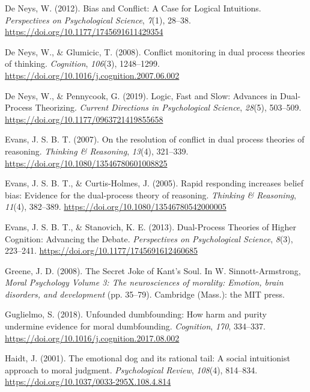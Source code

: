 \documentclass[
  american,
  man,floatsintext]{apa7}
\begin{document}
\leavevmode\hypertarget{ref-deneys_bias_2012}{}%
De Neys, W. (2012). Bias and Conflict: A Case for Logical Intuitions. \emph{Perspectives on Psychological Science}, \emph{7}(1), 28--38. \url{https://doi.org/10.1177/1745691611429354}

\leavevmode\hypertarget{ref-deneys_conflict_2008}{}%
De Neys, W., \& Glumicic, T. (2008). Conflict monitoring in dual process theories of thinking. \emph{Cognition}, \emph{106}(3), 1248--1299. \url{https://doi.org/10.1016/j.cognition.2007.06.002}

\leavevmode\hypertarget{ref-deneys_logic_2019}{}%
De Neys, W., \& Pennycook, G. (2019). Logic, Fast and Slow: Advances in Dual-Process Theorizing. \emph{Current Directions in Psychological Science}, \emph{28}(5), 503--509. \url{https://doi.org/10.1177/0963721419855658}

\leavevmode\hypertarget{ref-evans_resolution_2007}{}%
Evans, J. S. B. T. (2007). On the resolution of conflict in dual process theories of reasoning. \emph{Thinking \& Reasoning}, \emph{13}(4), 321--339. \url{https://doi.org/10.1080/13546780601008825}

\leavevmode\hypertarget{ref-evans_rapid_2005}{}%
Evans, J. S. B. T., \& Curtis-Holmes, J. (2005). Rapid responding increases belief bias: Evidence for the dual-process theory of reasoning. \emph{Thinking \& Reasoning}, \emph{11}(4), 382--389. \url{https://doi.org/10.1080/13546780542000005}

\leavevmode\hypertarget{ref-evans_dualprocess_2013}{}%
Evans, J. S. B. T., \& Stanovich, K. E. (2013). Dual-Process Theories of Higher Cognition: Advancing the Debate. \emph{Perspectives on Psychological Science}, \emph{8}(3), 223--241. \url{https://doi.org/10.1177/1745691612460685}

\leavevmode\hypertarget{ref-greene_secret_2008}{}%
Greene, J. D. (2008). The Secret Joke of Kant's Soul. In W. Sinnott-Armstrong, \emph{Moral Psychology Volume 3: The neurosciences of morality: Emotion, brain disorders, and development} (pp. 35--79). Cambridge (Mass.): the MIT press.

\leavevmode\hypertarget{ref-guglielmo_unfounded_2018}{}%
Guglielmo, S. (2018). Unfounded dumbfounding: How harm and purity undermine evidence for moral dumbfounding. \emph{Cognition}, \emph{170}, 334--337. \url{https://doi.org/10.1016/j.cognition.2017.08.002}

\leavevmode\hypertarget{ref-haidt_emotional_2001}{}%
Haidt, J. (2001). The emotional dog and its rational tail: A social intuitionist approach to moral judgment. \emph{Psychological Review}, \emph{108}(4), 814--834. \url{https://doi.org/10.1037/0033-295X.108.4.814}
\end{document}
